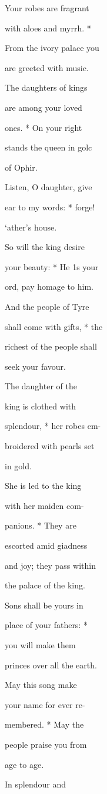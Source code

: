 \documentclass{breviary}
\begin{document}
\begin{brevbody}
\begin{rubricpar}
\end{rubricpar}
Your robes are fragrant

with aloes and myrrh. *

From the ivory palace you

are greeted with music.

The daughters of kings

are among your loved

ones. * On your right

stands the queen in golc

of Ophir.

Listen, O daughter, give

ear to my words: * forge!

\blackrule
\blackrule
‘ather’s house.

So will the king desire

your beauty: * He 1s your

ord, pay homage to him.

And the people of Tyre

shall come with gifts, * the

richest of the people shall

seek your favour.

The daughter of the

king is clothed with

splendour, * her robes em-

broidered with pearls set

in gold.

She is led to the king

with her maiden com-

panions. * They are

escorted amid giadness

and joy; they pass within

the palace of the king.

Sons shall be yours in

place of your fathers: *

you will make them

princes over all the earth.

May this song make

your name for ever re-

membered. * May the

people praise you from

age to age.

In splendour and


\end{brevbody}
\end{document}
